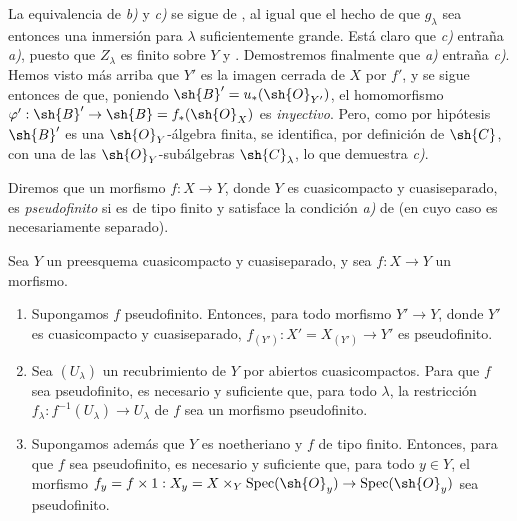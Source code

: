 La equivalencia de \emph{b)} y \emph{c)} se sigue de , al igual que el hecho de que $g_\lambda$ sea entonces una inmersión para $\lambda$ suficientemente grande.
Está claro que \emph{c)} entraña \emph{a)}, puesto que $Z_\lambda$ es finito sobre $Y$  y .
Demostremos finalmente que \emph{a)} entraña \emph{c)}.
Hemos visto más arriba que $Y'$ es la imagen cerrada de $X$ por $f'$, y se sigue entonces de  que, poniendo $\sh{B}'=u_*(\sh{O}_{Y'})$, el homomorfismo $\varphi':\sh{B}'\to\sh{B}=f_*(\sh{O}_X)$ es \emph{inyectivo}.
Pero, como por hipótesis $\sh{B}'$ es una $\sh{O}_Y$-álgebra finita, se identifica, por definición de $\sh{C}$, con una de las $\sh{O}_Y$-subálgebras $\sh{C}_\lambda$, lo que demuestra \emph{c)}.

Diremos que un morfismo $f:X\to Y$, donde $Y$ es cuasicompacto y cuasiseparado, es \emph{pseudofinito} si es de tipo finito y satisface la condición \emph{a)} de  (en cuyo caso es necesariamente separado).

\begin{corollary}[8.12.4]
\label{IV.8.12.4}
Sea $Y$ un preesquema cuasicompacto y cuasiseparado, y sea $f:X\to Y$ un morfismo.
\begin{enumerate}[label=(\roman*)]
  \item Supongamos $f$ pseudofinito.
Entonces, para todo morfismo $Y'\to Y$, donde $Y'$ es cuasicompacto y cuasiseparado, $f_{(Y')}:X'=X_{(Y')}\to Y'$ es pseudofinito.
  \item Sea $(U_\lambda)$ un recubrimiento de $Y$ por abiertos cuasicompactos.
Para que $f$ sea pseudofinito, es necesario y suficiente que, para todo $\lambda$, la restricción $f_\lambda:f^{-1}(U_\lambda)\to U_\lambda$ de $f$ sea un morfismo pseudofinito.
  \item Supongamos además que $Y$ es noetheriano y $f$ de tipo finito.
Entonces, para que $f$ sea pseudofinito, es necesario y suficiente que, para todo $y\in Y$, el morfismo $f_y=f\times 1:X_y=X\times_Y\operatorname{Spec}(\sh{O}_y)\to\operatorname{Spec}(\sh{O}_y)$ sea pseudofinito.
\end{enumerate}
\end{corollary}

